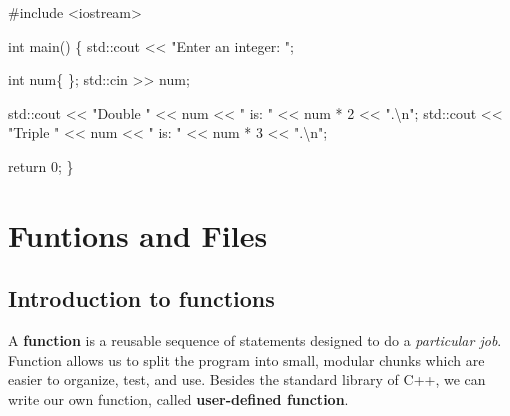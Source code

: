 \documentclass[
  letterpaper,
  DIV=11,
  numbers=noendperiod]{scrreprt}
\newenvironment{Shaded}{\begin{snugshade}}{\end{snugshade}}
\newcommand{\CommentTok}[1]{\textcolor[rgb]{0.37,0.37,0.37}{#1}}
\newcommand{\DecValTok}[1]{\textcolor[rgb]{0.68,0.00,0.00}{#1}}
\newcommand{\ErrorTok}[1]{\textcolor[rgb]{0.68,0.00,0.00}{#1}}
\newcommand{\FunctionTok}[1]{\textcolor[rgb]{0.28,0.35,0.67}{#1}}
\newcommand{\NormalTok}[1]{\textcolor[rgb]{0.00,0.23,0.31}{#1}}
\newcommand{\SpecialCharTok}[1]{\textcolor[rgb]{0.37,0.37,0.37}{#1}}
\newcommand{\StringTok}[1]{\textcolor[rgb]{0.13,0.47,0.30}{#1}}
\begin{document}
\begin{Shaded}
\begin{Highlighting}[]
\CommentTok{\#include \textless{}iostream\textgreater{}}

\NormalTok{int }\FunctionTok{main}\NormalTok{()}
\NormalTok{\{}
\NormalTok{    std}\SpecialCharTok{::}\NormalTok{cout }\SpecialCharTok{\textless{}}\ErrorTok{\textless{}} \StringTok{"Enter an integer: "}\NormalTok{;}
    
\NormalTok{    int num\{ \};}
\NormalTok{    std}\SpecialCharTok{::}\NormalTok{cin }\SpecialCharTok{\textgreater{}}\ErrorTok{\textgreater{}}\NormalTok{ num;}
    
\NormalTok{    std}\SpecialCharTok{::}\NormalTok{cout }\SpecialCharTok{\textless{}}\ErrorTok{\textless{}} \StringTok{"Double "} \SpecialCharTok{\textless{}}\ErrorTok{\textless{}}\NormalTok{ num }\SpecialCharTok{\textless{}}\ErrorTok{\textless{}} \StringTok{" is: "} \SpecialCharTok{\textless{}}\ErrorTok{\textless{}}\NormalTok{ num }\SpecialCharTok{*} \DecValTok{2} \SpecialCharTok{\textless{}}\ErrorTok{\textless{}} \StringTok{".}\SpecialCharTok{\textbackslash{}n}\StringTok{"}\NormalTok{;}
\NormalTok{    std}\SpecialCharTok{::}\NormalTok{cout }\SpecialCharTok{\textless{}}\ErrorTok{\textless{}} \StringTok{"Triple "} \SpecialCharTok{\textless{}}\ErrorTok{\textless{}}\NormalTok{ num }\SpecialCharTok{\textless{}}\ErrorTok{\textless{}} \StringTok{" is: "} \SpecialCharTok{\textless{}}\ErrorTok{\textless{}}\NormalTok{ num }\SpecialCharTok{*} \DecValTok{3} \SpecialCharTok{\textless{}}\ErrorTok{\textless{}} \StringTok{".}\SpecialCharTok{\textbackslash{}n}\StringTok{"}\NormalTok{;}

\NormalTok{    return }\DecValTok{0}\NormalTok{;}
\NormalTok{\}}
\end{Highlighting}
\end{Shaded}


\hypertarget{funtions-and-files}{%
\chapter{Funtions and Files}\label{funtions-and-files}}

\hypertarget{introduction-to-functions}{%
\section{Introduction to functions}\label{introduction-to-functions}}

A \textbf{function} is a reusable sequence of statements designed to do
a \emph{particular job}. Function allows us to split the program into
small, modular chunks which are easier to organize, test, and use.
Besides the standard library of C++, we can write our own function,
called \textbf{user-defined function}.
\end{document}
